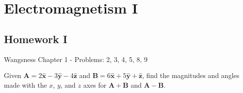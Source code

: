 \documentclass[crop=false,class=article,oneside]{standalone}
\begin{document}
    \ifx\ifemagi\undefined
        \section*{Electromagnetism I}
        \setcounter{section}{1}
    \fi
    \subsection{Homework I}
        Wangsness Chapter 1 - Problems: 2, 3, 4, 5, 8, 9
        \begin{problem}[Wangsness 1-2]
            Given
            $\mathbf{A}%
             =2\hat{\mathbf{x}}-3\hat{\mathbf{y}}%
             -4\hat{\mathbf{z}}$
            and
            $\mathbf{B}%
             =6\hat{\mathbf{x}}+5\hat{\mathbf{y}}%
             +\hat{\mathbf{z}}$,
            find the magnitudes and angles made with the $x$,
            $y$, and $z$ axes for
            $\mathbf{A}+\mathbf{B}$ and $\mathbf{A}-\mathbf{B}$.
        \end{problem}
\end{document}
